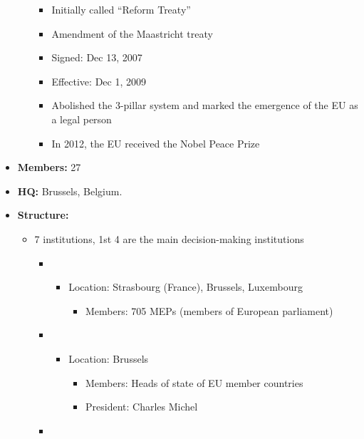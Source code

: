 \documentclass[
  12pt,
  ignorenonframetext,
  progressbar=frametitle]{beamer}
\providecommand{\tightlist}{%
  \setlength{\itemsep}{0pt}\setlength{\parskip}{0pt}}
\begin{document}
\begin{frame}[allowframebreaks]
\begin{itemize}
\begin{itemize}
    \begin{itemize}
    \tightlist
    \item
      Initially called ``Reform Treaty''
    \item
      Amendment of the Maastricht treaty
    \item
      Signed: Dec 13, 2007
    \item
      Effective: Dec 1, 2009
    \item
      Abolished the 3-pillar system and marked the emergence of the EU
      as a legal person
    \item
      In 2012, the EU received the Nobel Peace Prize
    \end{itemize}
  \end{itemize}
\item
  \textbf{Members:} 27
\item
  \textbf{HQ:} Brussels, Belgium.
\item
  \textbf{Structure:}

  \begin{itemize}
  \tightlist
  \item
    7 institutions, 1st 4 are the main decision-making institutions

    \begin{itemize}
    \item

      \begin{itemize}
      \tightlist
      \item
        Location: Strasbourg (France), Brussels, Luxembourg

        \begin{itemize}
        \tightlist
        \item
          Members: 705 MEPs (members of European parliament)
        \end{itemize}
      \end{itemize}
    \item

      \begin{itemize}
      \tightlist
      \item
        Location: Brussels

        \begin{itemize}
        \tightlist
        \item
          Members: Heads of state of EU member countries
        \item
          President: Charles Michel
        \end{itemize}
      \end{itemize}
    \item


\end{itemize}
\end{itemize}
\end{itemize}
\end{frame}
\end{document}
